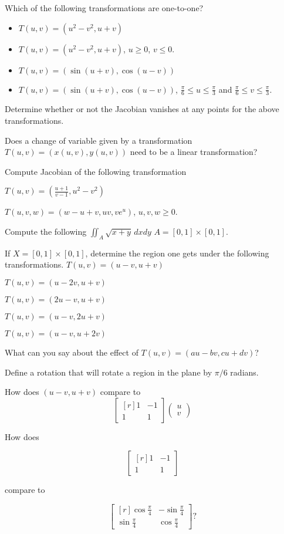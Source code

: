 \documentclass{amsart}
\begin{document}
{
Which of the following transformations are one-to-one?

\begin{itemize}
	\item $T(u,v) = (u^2-v^2, u+v)$
	\item $T(u,v) = (u^2 - v^2, u+v)$, $u\geq 0$, $v\leq 0$.
	\item  $T(u,v) = (\sin (u+v), \cos (u-v))$
	\item $T(u,v) = (\sin (u+v), \cos (u-v))$, $\frac{\pi}{6}\leq u\leq \frac{\pi}{3}$ and $\frac{\pi}{6} \leq v\leq  \frac{\pi}{3}$.
\end{itemize}
}
{
}

{
Determine whether or not the Jacobian vanishes at any points for the above transformations.
}
{
}

{
Does a change of variable given by a transformation $T(u,v) = (x(u,v), y(u,v))$ need to be a linear transformation?
}
{
}

Compute Jacobian of the following transformation

{
$T(u,v) = \left(\frac{u+1}{v-1}, u^2-v^2\right)$
}
{
}

{
$T(u,v,w) = \left (w-u + v, uv, ve^u\right)$, $u,v,w\geq 0$.
}
{
}

Compute the following 
{
$\iint_A \sqrt{x+y} \, dxdy$ $A=[0,1]\times [0,1]$.
}
{
}

If $X= [0,1]\times [0,1]$, determine the region one gets under the following transformations.
{
$T(u,v) = (u-v,u+v)$
}
{
}

{
$T(u,v) = (u-2v,u+v)$
}
{
}

{
$T(u,v) = (2u-v,u+v)$
}
{
}

{
$T(u,v) = (u-v,2u+v)$
}
{
}

{
$T(u,v) = (u-v,u+2v)$
}
{
}

{
What can you say about the effect of $T(u,v) = (au-bv,cu+dv)$?
}
{
}

{
Define a rotation that will rotate a region in the plane by $\pi/6$ radians.
}
{
}

{
How does $(u-v,u+v)$ compare to 
\[
\begin{bmatrix*}[r]
	1 & -1\\
	1 & 1
\end{bmatrix*}
\begin{pmatrix}
	u \\ 
	v
\end{pmatrix}
\]
}
{
}


{
How does 

\[
\begin{bmatrix*}[r]
	1 & -1\\
	1 & 1
\end{bmatrix*}
\]

compare to 


\[
\begin{bmatrix*}[r]
	\cos \frac{\pi}{4}  & -\sin\frac{\pi}{4}\\
	\sin \frac{\pi}{4} & \cos \frac{\pi}{4}
\end{bmatrix*}?
\]
}
{
}
\end{document}

